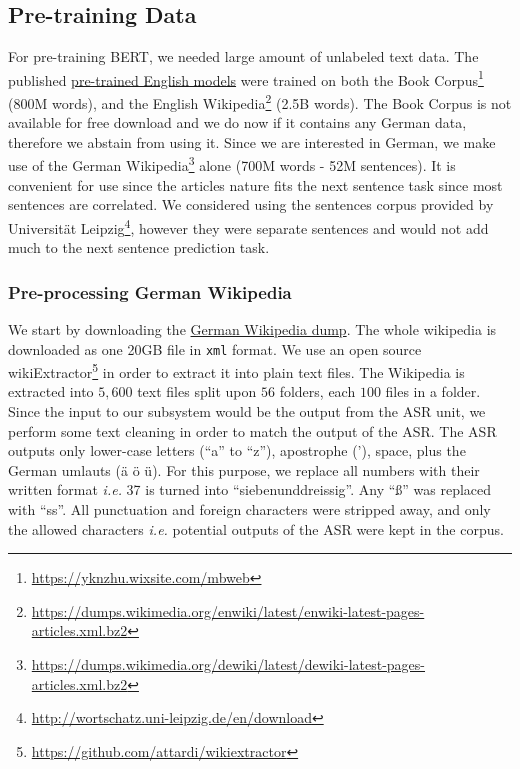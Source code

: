 \subsection{Pre-training Data}
\label{meth:s5_sub3}

For pre-training \ac{BERT}, we needed large amount of unlabeled text data. The published \href{https://github.com/google-research/bert#pre-trained-models}{pre-trained English models} were trained on both the Book Corpus\footnote{\url{https://yknzhu.wixsite.com/mbweb}} (800M words), and the English Wikipedia\footnote{\url{https://dumps.wikimedia.org/enwiki/latest/enwiki-latest-pages-articles.xml.bz2}} (2.5B words). The Book Corpus is not available for free download and we do now if it contains any German data, therefore we abstain from using it. Since we are interested in German, we make use of the German Wikipedia\footnote{\url{https://dumps.wikimedia.org/dewiki/latest/dewiki-latest-pages-articles.xml.bz2}} alone (700M words - 52M sentences). It is convenient for use since the articles nature fits the next sentence task since most sentences are correlated. We considered using the sentences corpus provided by Universit{\"a}t Leipzig\footnote{\url{http://wortschatz.uni-leipzig.de/en/download}}, however they were separate sentences and would not add much to the next sentence prediction task. 

\subsubsection{Pre-processing German Wikipedia}
\label{meth:s5_sub3_subsub1}
We start by downloading the \href{https://dumps.wikimedia.org/dewiki/latest/dewiki-latest-pages-articles.xml.bz2}{German Wikipedia dump}. The whole wikipedia is downloaded as one 20GB file in \texttt{xml} format. We use an open source wikiExtractor\footnote{\url{https://github.com/attardi/wikiextractor}} in order to extract it into plain text files. The Wikipedia is extracted into $5,600$ text files split upon $56$ folders, each $100$ files in a folder. Since the input to our subsystem would be the output from the \ac{ASR} unit, we perform some text cleaning in order to match the output of the \ac{ASR}. The \ac{ASR} outputs only lower-case letters (\enquote{a} to \enquote{z}), apostrophe ('), space, plus the German umlauts ({\"a} {\"o} {\"u}). For this purpose, we replace all numbers with their written format \textit{i.e.} 37 is turned into \enquote{siebenunddreissig}. Any \enquote{\ss} was replaced with \enquote{ss}. All punctuation and foreign characters were stripped away, and only the allowed characters \textit{i.e.} potential outputs of the \ac{ASR} were kept in the corpus.


